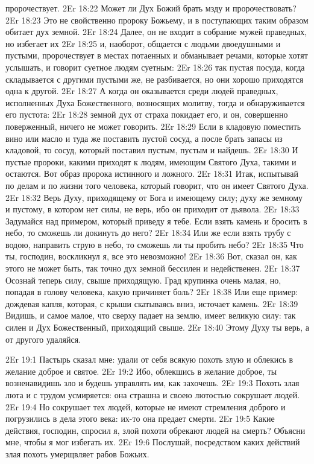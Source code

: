пророчествует.
\vs 2Er 18:22
Может ли Дух Божий брать
мзду и пророчествовать?
\vs 2Er 18:23
Это не свойственно
пророку Божьему, и в поступающих таким образом обитает дух земной.
\vs 2Er 18:24
Далее, он не входит в
собрание мужей праведных, но избегает их
\vs 2Er 18:25
и, наоборот, общается с
людьми двоедушными и пустыми, пророчествует в местах потаенных и обманывает
речами, которые хотят услышать, и говорит суетное людям суетным:
\vs 2Er 18:26
так пустая посуда, когда
складывается с другими пустыми же, не разбивается, но они хорошо приходятся
одна к другой.
\vs 2Er 18:27
А когда он оказывается
среди людей праведных, исполненных Духа Божественного, возносящих молитву,
тогда и обнаруживается его пустота:
\vs 2Er 18:28
земной дух от страха
покидает его, и он, совершенно поверженный, ничего не может говорить.
\vs 2Er 18:29
Если в кладовую поместить
вино или масло и туда же поставить пустой сосуд, а после брать запасы из
кладовой, то сосуд, который поставил пустым, пустым и найдешь.
\vs 2Er 18:30
И пустые пророки, какими
приходят к людям, имеющим Святого Духа, такими и остаются. Вот образ пророка
истинного и ложного.
\vs 2Er 18:31
Итак, испытывай по делам
и по жизни того человека, который говорит, что он имеет Святого Духа.
\vs 2Er 18:32
Верь Духу, приходящему от
Бога и имеющему силу; духу же земному и пустому, в котором нет силы, не верь,
ибо он приходит от дьявола.
\vs 2Er 18:33
Задумайся над примером,
который приведу я тебе. Если взять камень и бросить в небо, то сможешь ли
докинуть до него?
\vs 2Er 18:34
Или же если взять трубу с
водою, направить струю в небо, то сможешь ли ты пробить небо?
\vs 2Er 18:35
Что ты, господин,
воскликнул я, все это невозможно!
\vs 2Er 18:36
Вот, сказал он, как
этого не может быть, так точно дух земной бессилен и недейственен.
\vs 2Er 18:37
Осознай теперь силу,
свыше приходящую. Град крупинка очень малая, но, попадая в голову человека,
какую причиняет боль?
\vs 2Er 18:38
Или еще пример: дождевая
капля, которая, с крыши скатываясь вниз, источает камень.
\vs 2Er 18:39
Видишь, и самое малое,
что сверху падает на землю, имеет великую силу: так силен и Дух Божественный,
приходящий свыше.
\vs 2Er 18:40
Этому Духу ты верь, а от
другого удаляйся.

\vs 2Er 19:1
Пастырь сказал мне: удали от себя всякую похоть злую и облекись в желание
доброе и святое.
\vs 2Er 19:2
Ибо, облекшись в желание
доброе, ты возненавидишь зло и будешь управлять им, как захочешь.
\vs 2Er 19:3
Похоть злая люта и с
трудом усмиряется: она страшна и своею лютостью сокрушает людей.
\vs 2Er 19:4
Но сокрушает тех людей,
которые не имеют стремления доброго и погрузились в дела этого века: их-то она
предает смерти.
\vs 2Er 19:5
Какие действия, господин,
спросил я, злой похоти обрекают людей на смерть? Объясни мне, чтобы я мог
избегать их.
\vs 2Er 19:6
Послушай, посредством
каких действий злая похоть умерщвляет рабов Божьих.

